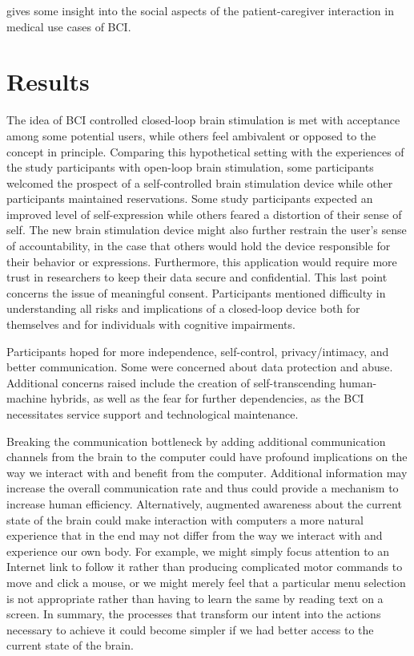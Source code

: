 \documentclass[fleqn,11pt]{olplainarticle}
\begin{document}
gives some insight into the social aspects of the patient-caregiver interaction in medical use cases of BCI.

\section{Results}
\label{sec:results}
The idea of BCI controlled closed-loop brain stimulation is met with acceptance among some potential users, while others feel ambivalent or opposed to the concept in principle. Comparing this hypothetical setting with the experiences of the study participants with open-loop brain stimulation, some participants welcomed the prospect of a self-controlled brain stimulation device while other participants maintained reservations. Some study participants expected an improved level of self-expression while others feared a distortion of their sense of self. The new brain stimulation device might also further restrain the user’s sense of accountability, in the case that others would hold the device responsible for their behavior or expressions. Furthermore, this application would require more trust in researchers to keep their data secure and confidential. This last point concerns the issue of meaningful consent. Participants mentioned difficulty in understanding all risks and implications of a closed-loop device both for themselves and for individuals with cognitive impairments. \cite{kogel2019using}

Participants hoped for more independence, self-control, privacy/intimacy, and better communication. Some were concerned about data protection and abuse. Additional concerns raised include the creation of self-transcending human-machine hybrids, as well as the fear for further dependencies, as the BCI necessitates service support and technological maintenance. \cite{kogel2019using}

Breaking the communication bottleneck by adding additional communication channels from the brain to the computer could have profound implications on the way we interact with and benefit from the computer. Additional information may increase the overall communication rate and thus could provide a mechanism to increase human efficiency. Alternatively, augmented awareness about the current state of the brain could make interaction with computers a more natural experience that in the end may not differ from the way we interact with and experience our own body. For example, we might simply focus attention to an Internet link to follow it rather than producing complicated motor commands to move and click a mouse, or we might merely feel that a particular menu selection is not appropriate rather than having to learn the same by reading text on a screen. In summary, the processes that transform our intent into the actions necessary to achieve it could become simpler if we had better access to the current state of the brain. \cite{schalk2008brain}
\end{document}
